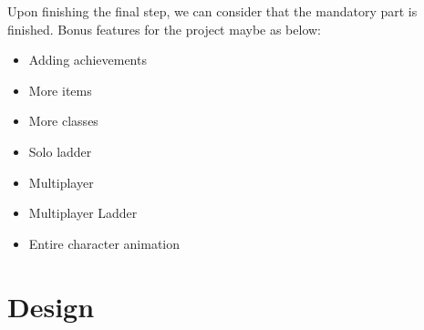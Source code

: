 \documentclass[16pt, oneside]{report}
\begin{document}
Upon finishing the final step, we can consider that the mandatory part is finished. Bonus features for the project maybe as below: \\
\begin{itemize}
	\item	Adding achievements
	\item	More items
	\item	More classes
	\item	Solo ladder
	\item Multiplayer
	\item	 Multiplayer Ladder
	\item	Entire character animation
\end{itemize}

\chapter{Design}
\end{document}
